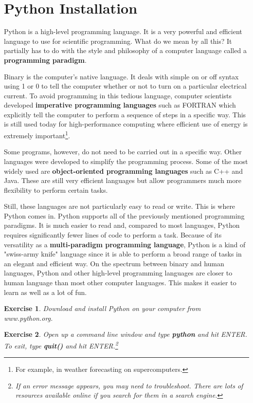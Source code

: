 \documentclass[12pt]{amsart}
\newtheorem{quest}{Exercise}
\theoremstyle{definition}
\begin{document}
\section{Python Installation}%

Python is a high-level programming language. It is a very powerful and efficient language to use for scientific programming. What do we mean by all this? It partially has to do with the style and philosophy of a computer language called a \textbf{programming paradigm}.

Binary is the computer's native language. It deals with simple on or off syntax using 1 or 0 to tell the computer whether or not to turn on a particular electrical current. To avoid programming in this tedious language, computer scientists developed \textbf{imperative programming languages} such as FORTRAN which explicitly tell the computer to perform a sequence of steps in a specific way. This is still used today for high-performance computing where efficient use of energy is extremely important\footnote{For example, in weather forecasting on supercomputers.}.

Some programs, however, do not need to be carried out in a specific way. Other languages were developed to simplify the programming process. Some of the most widely used are \textbf{object-oriented programming languages} such as C++ and Java. These are still very efficient languages but allow programmers much more flexibility to perform certain tasks.

Still, these languages are not particularly easy to read or write. This is where Python comes in. Python supports all of the previously mentioned programming paradigms. It is much easier to read and, compared to most languages, Python requires significantly fewer lines of code to perform a task. Because of its versatility as a \textbf{multi-paradigm programming language}, Python is a kind of "swiss-army knife" language since it is able to perform a broad range of tasks in an elegant and efficient way. On the spectrum between binary and human languages, Python and other high-level programming languages are closer to human language than most other computer languages. This makes it easier to learn as well as a lot of fun.

\begin{quest}
Download and install Python on your computer from www.python.org.
\end{quest}
\begin{quest}
Open up a command line window and type \textbf{python} and hit ENTER. To exit, type \textbf{quit()} and hit ENTER.\footnote{If an error message appears, you may need to troubleshoot. There are lots of resources available online if you search for them in a search engine.}
\end{quest}
\end{document}
